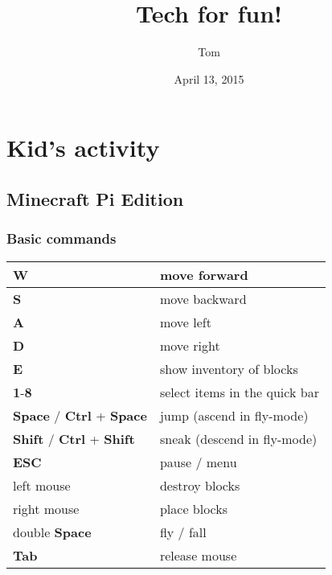 \documentclass[letterpaper,10pt,english]{sphinxmanual}
\title{Tech for fun!}
\date{April 13, 2015}
\author{Tom}
\begin{document}
\maketitle
\tableofcontents
{}\label{index::doc}



\chapter{Kid's activity}
\label{index:kid-s-activity}\label{index:tech-for-fun}

\section{Minecraft Pi Edition}
\label{kid/minecraft::doc}\label{kid/minecraft:minecraft-pi-edition}

\subsection{Basic commands}
\label{kid/minecraft:basic-commands}
\begin{tabulary}{\linewidth}{|L|L|}
\hline

\textbf{W}
 & 
move forward
\\
\hline
\textbf{S}
 & 
move backward
\\
\hline
\textbf{A}
 & 
move left
\\
\hline
\textbf{D}
 & 
move right
\\
\hline
\textbf{E}
 & 
show inventory of blocks
\\
\hline
\textbf{1}-\textbf{8}
 & 
select items in the quick bar
\\
\hline
\textbf{Space} / \textbf{Ctrl} + \textbf{Space}
 & 
jump (ascend in fly-mode)
\\
\hline
\textbf{Shift} / \textbf{Ctrl} + \textbf{Shift}
 & 
sneak (descend in fly-mode)
\\
\hline
\textbf{ESC}
 & 
pause / menu
\\
\hline
left mouse
 & 
destroy blocks
\\
\hline
right mouse
 & 
place blocks
\\
\hline
double \textbf{Space}
 & 
fly / fall
\\
\hline
\textbf{Tab}
 & 
release mouse
\\
\hline\end{tabulary}
\end{document}
